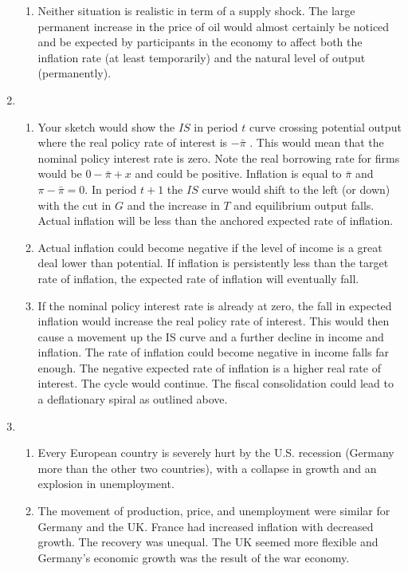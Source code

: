 \documentclass[12pt]{article}
\begin{document}
\begin{enumerate}[label=\arabic*.]
\begin{enumerate}[label=(\alph*)]
        \item Neither situation is realistic in term of a supply shock. The large permanent increase in the price of oil would almost certainly be noticed and be expected by participants in the economy to affect both the inflation rate (at least temporarily) and the natural level of output (permanently).
    \end{enumerate}
    \item \begin{enumerate}[label=(\alph*)]
        \item Your sketch would show the $IS$ in period $t$ curve crossing potential output where the real policy rate of interest is $-\bar{\pi}$ . This would mean that the nominal policy interest rate is zero. Note the real borrowing rate for firms would be $0 - \bar{\pi} + x$ and could be positive. Inflation is equal to $\bar{\pi}$ and $\pi-\bar{\pi}=0$. In period $t+1$ the $IS$ curve would shift to the left (or down) with the cut in $G$ and the increase in $T$ and equilibrium output falls. Actual inflation will be less than the anchored expected rate of inflation.
        \item Actual inflation could become negative if the level of income is a great deal lower than potential. If inflation is persistently less than the target rate of inflation, the expected rate of inflation will eventually fall.
        \item If the nominal policy interest rate is already at zero, the fall in expected inflation would increase the real policy rate of interest. This would then cause a movement up the IS curve and a further decline in income and inflation. The rate of inflation could become negative in income falls far enough. The negative expected rate of inflation is a higher real rate of interest. The cycle would continue. The fiscal consolidation could lead to a deflationary spiral as outlined above.
    \end{enumerate}
    \item \begin{enumerate}[label=(\alph*)]
        \item Every European country is severely hurt by the U.S. recession (Germany more than the other two countries), with a collapse in growth and an explosion in unemployment.
        \item The movement of production, price, and unemployment were similar for Germany and the UK. France had increased inflation with decreased growth. The recovery was unequal. The UK seemed more flexible and Germany’s economic growth was the result of the war economy.
    \end{enumerate}
\end{enumerate}
\end{document}
